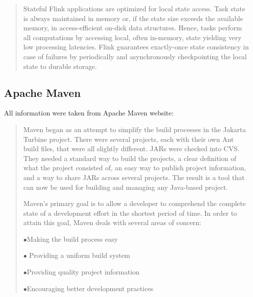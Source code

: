 \begin{quote}
Stateful Flink applications are optimized for local state access. Task state is always maintained in memory or, if the state size exceeds the available memory, in access-efficient on-disk data structures. Hence, tasks perform all computations by accessing local, often in-memory, state yielding very low processing latencies. Flink guarantees exactly-once state consistency in case of failures by periodically and asynchronously checkpointing the local state to durable storage.

\end{quote}
\subsection{Apache Maven}
All information were taken from Apache Maven website: 
\begin{quote}

Maven began as an attempt to simplify the build processes in the Jakarta Turbine project. There were several projects, each with their own Ant build files, that were all slightly different. JARs were checked into CVS. They needed a standard way to build the projects, a clear definition of what the project consisted of, an easy way to publish project information, and a way to share JARs across several projects.
The result is a tool that can now be used for building and managing any Java-based project. 

Maven’s primary goal is to allow a developer to comprehend the complete state of a development effort in the shortest period of time. In order to attain this goal, Maven deals with several areas of concern:
   \begin{description}
    \item $\bullet$Making the build process easy
   \item $\bullet$ Providing a uniform build system
    \item $\bullet$Providing quality project information
    \item $\bullet$Encouraging better development practices
      \end{description}




\end{quote}
